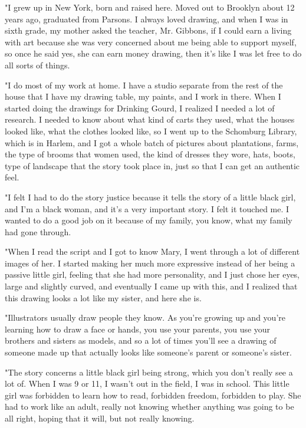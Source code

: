 "I grew up in New York, born and raised here. Moved out to Brooklyn about 12 years ago, graduated from Parsons. I always loved drawing, and when I was in sixth grade, my mother asked the teacher, Mr. Gibbons, if I could earn a living with art because she was very concerned about me being able to support myself, so once he said yes, she can earn money drawing, then it's like I was let free to do all sorts of things.

"I do most of my work at home. I have a studio separate from the rest of the house that I have my drawing table, my paints, and I work in there. When I started doing the drawings for Drinking Gourd, I realized I needed a lot of research. I needed to know about what kind of carts they used, what the houses looked like, what the clothes looked like, so I went up to the Schomburg Library, which is in Harlem, and I got a whole batch of pictures about plantations, farms, the type of brooms that women used, the kind of dresses they wore, hats, boots, type of landscape that the story took place in, just so that I can get an authentic feel.

"I felt I had to do the story justice because it tells the story of a little black girl, and I'm a black woman, and it's a very important story. I felt it touched me. I wanted to do a good job on it because of my family, you know, what my family had gone through.

"When I read the script and I got to know Mary, I went through a lot of different images of her. I started making her much more expressive instead of her being a passive little girl, feeling that she had more personality, and I just chose her eyes, large and slightly curved, and eventually I came up with this, and I realized that this drawing looks a lot like my sister, and here she is.

"Illustrators usually draw people they know. As you're growing up and you're learning how to draw a face or hands, you use your parents, you use your brothers and sisters as models, and so a lot of times you'll see a drawing of someone made up that actually looks like someone's parent or someone's sister.

"The story concerns a little black girl being strong, which you don't really see a lot of. When I was 9 or 11, I wasn't out in the field, I was in school. This little girl was forbidden to learn how to read, forbidden freedom, forbidden to play. She had to work like an adult, really not knowing whether anything was going to be all right, hoping that it will, but not really knowing.

